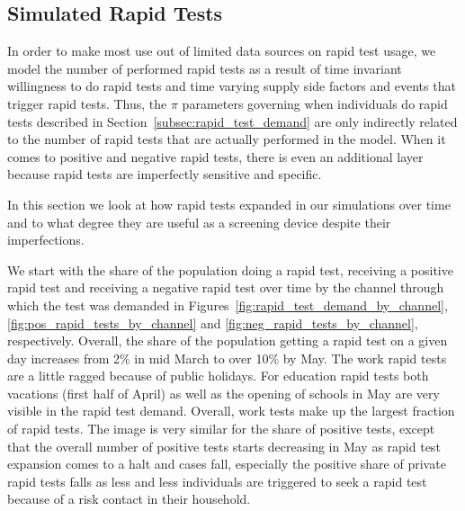 \subsection{Simulated Rapid Tests}
\label{subsec:results_rapid_test_statistics}

In order to make most use out of limited data sources on rapid test usage, we model the
number of performed rapid tests as a result of time invariant willingness to do rapid
tests and time varying supply side factors and events that trigger rapid tests. Thus, the
$\pi$ parameters governing when individuals do rapid tests described in
Section~\ref{subsec:rapid_test_demand} are only indirectly related to the number of rapid
tests that are actually performed in the model. When it comes to positive and negative
rapid tests, there is even an additional layer because rapid tests are imperfectly
sensitive and specific.

In this section we look at how rapid tests expanded in our simulations over time and to
what degree they are useful as a screening device despite their imperfections.

We start with the share of the population doing a rapid test, receiving a positive rapid
test and receiving a negative rapid test over time by the channel through which the test
was demanded in Figures~\ref{fig:rapid_test_demand_by_channel},
\ref{fig:pos_rapid_tests_by_channel} and \ref{fig:neg_rapid_tests_by_channel},
respectively. Overall, the share of the population getting a rapid test on a given day
increases from 2\% in mid March to over 10\% by May. The work rapid tests are a little
ragged because of public holidays. For education rapid tests both vacations (first half
of April) as well as the opening of schools in May are very visible in the rapid test
demand. Overall, work tests make up the largest fraction of rapid tests. The image is
very similar for the share of positive tests, except that the overall number of positive
tests starts decreasing in May as rapid test expansion comes to a halt and cases fall,
especially the positive share of private rapid tests falls as less and less individuals
are triggered to seek a rapid test because of a risk contact in their household.

